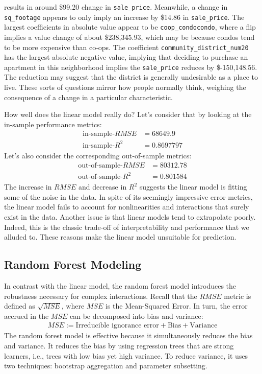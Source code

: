 \documentclass[11pt]{article}
\begin{document}
	results in around \$99.20 change in \verb|sale_price|. Meanwhile,
	a change in \verb|sq_footage| appears to only imply an increase by \$14.86
	in \verb|sale_price|. The largest coefficients in absolute value
	appear to be \verb|coop_condocondo|, where a flip implies a value change
	of about \$238,345.93, which may be because condos tend to be more
	expensive than co-ops. The coefficient \verb|community_district_num20|
	has the largest absolute negative value, implying that deciding to
	purchase an apartment in this neighborhood implies the \verb|sale_price|
	reduces by \$-150,148.56. The reduction may suggest that the district
	is generally undesirable as a place to live. These sorts of questions
	mirror how people normally think, weighing the consequence of a change
	in a particular characteristic.
	
	How well does the linear model really do? Let's consider that
	by looking at the in-sample performance metrics:
	\begin{align*}
		\text{in-sample-}RMSE &= 68649.9 \\
		\text{in-sample-} R^2  &= 0.8697797 
	\end{align*}
	Let's also consider the corresponding out-of-sample metrics:
	\begin{align*}
		\text{out-of-sample-}RMSE &= 80312.78\\
		\text{out-of-sample-} R^2 &= 0.801584 
	\end{align*}
	The increase in $RMSE$ and decrease in $R^2$ suggests the linear model
	is fitting some of the noise in the data. In spite of its seemingly
	impressive error metrics, the linear model fails to account for
	nonlinearities and interactions that surely exist in the data.
	Another issue is that linear models tend to extrapolate poorly.
	Indeed, this is the classic trade-off of interpretability and
	performance that we alluded to. These reasons make the linear model
	unsuitable for prediction.
	\subsection{Random Forest Modeling}
	In contrast with the linear model, the random forest model introduces
	the robustness necessary for complex interactions. Recall that
	the $RMSE$ metric is defined as $\sqrt{MSE}$, where $MSE$ is the
	Mean-Squared Error. In turn, the error accrued in the $MSE$ can
	be decomposed into bias and variance:
	\begin{align*}
		MSE := \text{Irreducible ignorance error} + \text{Bias} + \text{Variance}
	\end{align*}
	The random forest model is effective because it simultaneously reduces
	the bias and variance. It reduces the bias by using regression trees that
	are strong learners, i.e., trees with low bias yet high variance.
	To reduce variance, it uses two techniques: bootstrap aggregation
	and parameter subsetting.
	
\end{document}
